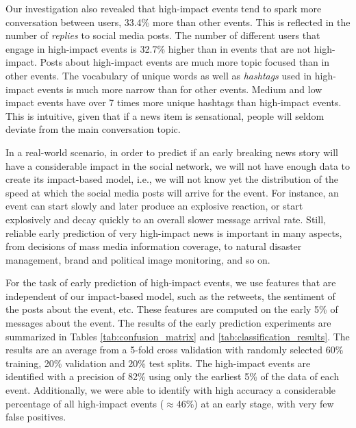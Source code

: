 \documentclass[10pt,letterpaper]{article}
\begin{document}
Our investigation also revealed that high-impact events tend to spark more conversation
between users, 33.4\% more than other events. This is reflected in the
number of {\em replies} to social media posts. The number of different
users that engage in high-impact events is 32.7\% higher than in
events that are not high-impact. Posts about high-impact events are
much more topic focused than in other events. The vocabulary of unique
words as well as {\em hashtags} used in high-impact events is much
more narrow than for other events. Medium and low impact events have
over 7 times more unique hashtags than high-impact events. This is
intuitive, given that if a news item is sensational, people will
seldom deviate from the main conversation topic.


In a real-world scenario, in order to predict if an early breaking
news story will have a considerable impact in the social network, we
will not have enough data to create its impact-based model, i.e., we will not know yet the distribution of the speed at which the
social media posts will arrive for the event. For instance, an event
can start slowly and later produce an explosive reaction, or start
explosively and decay quickly to an overall slower message arrival
rate. Still, reliable early prediction of very high-impact news is
important in many aspects, from decisions of mass media information
coverage, to natural disaster management, brand and political image
monitoring, and so on.

For the task of early prediction of high-impact events, we use features 
that are independent of our impact-based model, such as
the retweets, the sentiment of the posts about the event, etc. 
These features are computed on the early 5\% of messages about the event.
The results of the early prediction experiments are summarized in Tables
\ref{tab:confusion_matrix} and \ref{tab:classification_results}.
The results are an average from a 5-fold cross validation with randomly selected
60\% training, 20\% validation and 20\% test splits.  
The high-impact events are identified with a precision of 82\%
using only the earliest 5\% of the data of each event.
Additionally, we were able to identify with high accuracy a
considerable percentage of all high-impact events ($\approx 46\%$)
at an early stage, with very few false positives. 
\end{document}
